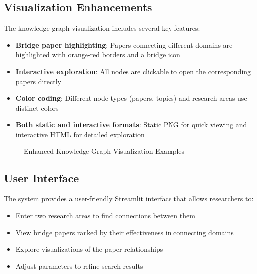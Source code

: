 \documentclass[11pt,a4paper]{article}
\begin{document}
\subsection{Visualization Enhancements}
The knowledge graph visualization includes several key features:
\begin{itemize}
    \item \textbf{Bridge paper highlighting}: Papers connecting different domains are highlighted with orange-red borders and a bridge icon
    \item \textbf{Interactive exploration}: All nodes are clickable to open the corresponding papers directly
    \item \textbf{Color coding}: Different node types (papers, topics) and research areas use distinct colors
    \item \textbf{Both static and interactive formats}: Static PNG for quick viewing and interactive HTML for detailed exploration
\end{itemize}

\begin{figure}[htbp]
\centering
{}
\caption{Enhanced Knowledge Graph Visualization Examples}
\label{fig:graph_vis}
\end{figure}

\subsection{User Interface}
The system provides a user-friendly Streamlit interface that allows researchers to:
\begin{itemize}
    \item Enter two research areas to find connections between them
    \item View bridge papers ranked by their effectiveness in connecting domains
    \item Explore visualizations of the paper relationships
    \item Adjust parameters to refine search results
\end{itemize}
\end{document}
